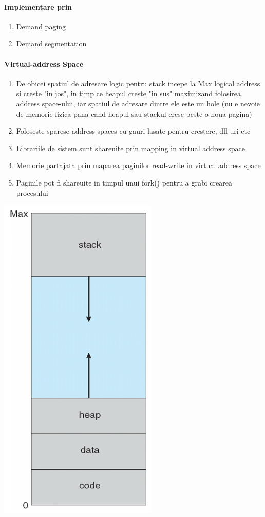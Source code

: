 \documentclass{article}
\begin{document}
\paragraph*{Implementare prin}
\begin{enumerate}
    \item Demand paging
    \item Demand segmentation
\end{enumerate}

\paragraph*{Virtual-address Space}
\begin{enumerate}
    \item De obicei spatiul de adresare logic pentru stack incepe la Max logical address si creste "in jos", in timp ce heapul creste "in sus" maximizand folosirea address space-ului, iar spatiul de adresare dintre ele este un hole (nu e nevoie de memorie fizica pana cand heapul sau stackul cresc peste o noua pagina)
    \item Foloseste sparese address spaces cu gauri lasate pentru crestere, dll-uri etc
    \item Librariile de sistem sunt shareuite prin mapping in virtual address space
    \item Memorie partajata prin maparea paginilor read-write in virtual address space
    \item Paginile pot fi shareuite in timpul unui fork() pentru a grabi crearea procesului
\end{enumerate}

\begin{center}
    \includegraphics[scale=0.3]{30-vas.png}
\end{center}
\end{document}
